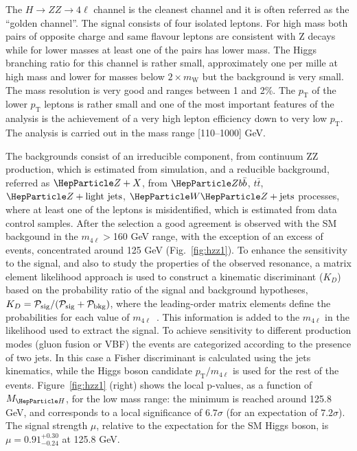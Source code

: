 \documentclass{cimento}
\newcommand{\MW}{\ensuremath{m_{\mathrm{W}}}\xspace}
\newcommand{\MH}{\ensuremath{M_{\PH}}}
\newcommand{\cPZ}{\PZ} %
\newcommand{\PT}{\ensuremath{p_{\mathrm{T}}}\xspace}
\newcommand{\pt}{\ensuremath{p_{\mathrm{T}}}\xspace}
\newcommand{\ttbar}{\ensuremath{t\bar{t}}}
\newcommand{\bbbar}{\ensuremath{b\bar{b}}}
\begin{document}
The $H \to ZZ \to 4\ell$ channel is the cleanest channel and it is
often referred as the ``golden channel''.  The signal consists of four
isolated leptons. For high mass both pairs of opposite charge and same
flavour leptons are consistent with Z decays while for lower masses at
least one of the pairs has lower mass.  The Higgs branching ratio for
this channel is rather small, approximately one per mille at high mass
and lower for masses below $2\times\MW$ but the background is very
small.  The mass resolution is very good and ranges between 1 and 2\%.
The \pt of the lower \pt leptons is rather small and one of the most
important features of the analysis is the achievement of a very high
lepton efficiency down to very low \pt.  The analysis is carried out
in the mass range [110--1000] GeV.

The backgrounds consist of an irreducible component, from continuum ZZ
production, which is estimated from simulation, and a reducible
background, referred as $\cPZ+X$, from $\cPZ\bbbar$, $\ttbar$,
$\cPZ+\text{light jets}$, $\PW\cPZ+\text{jets}$ processes, where at
least one of the leptons is misidentified, which is estimated from
data control samples. After the selection a good agreement is observed
with the SM backgound in the $m_{4\ell}>$160 GeV range, with the
exception of an excess of events, concentrated around 125 GeV
(Fig.~\ref{fig:hzz1}). To enhance the sensitivity to the signal, and
also to study the properties of the observed resonance, a matrix
element likelihood approach is used to construct a kinematic
discriminant ($K_D$) based on the probability ratio of the signal and
background hypotheses, $K_D = {\cal P_\mathrm{sig}}/({\cal
P_\mathrm{sig}}+{\cal P_\mathrm{bkg}})$, where the leading-order
matrix elements define the probabilities for each value of
$m_{4\ell}$~\cite{Chatrchyan:2012ufa}.  This information is added to
the $m_{4\ell}$ in the likelihood used to extract the signal.  To
achieve sensitivity to different production modes (gluon fusion or
VBF) the events are categorized according to the presence of two
jets. In this case a Fisher discriminant is calculated using the jets
kinematics, while the Higgs boson candidate $\PT/m_{4\ell}$ is used
for the rest of the events.  Figure~\ref{fig:hzz1} (right) shows the
local p-values, as a function of $\MH$, for the low mass range: the
minimum is reached around 125.8 GeV, and corresponds to a local
significance of $6.7\sigma$ (for an expectation of $7.2\sigma$). The
signal strength $\mu$, relative to the expectation for the SM Higgs
boson, is $\mu = 0.91^{+ 0.30}_{-0.24}$ at 125.8 GeV.
\end{document}

